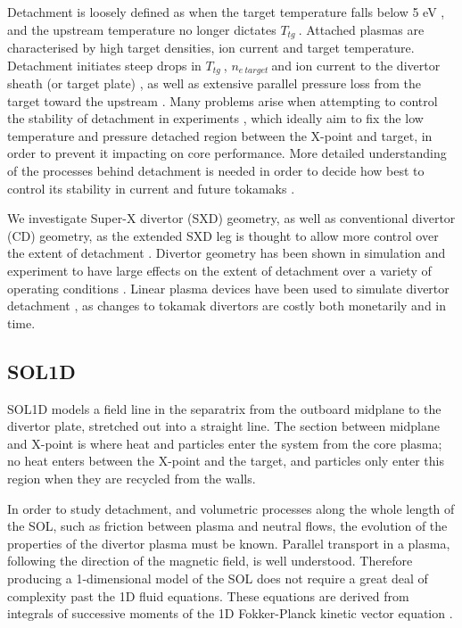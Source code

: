 \documentclass[12pt]{article}  %
\providecommand{\netarget}{$n_{e~target}~$} %
\providecommand{\Ttg}{$T_{tg}~$} %
\begin{document}
Detachment is loosely defined as when the target temperature falls below 5 eV \cite{Porter1996}, and the upstream temperature no longer dictates \Ttg. Attached plasmas are characterised by high target densities, ion current and target temperature. Detachment initiates steep drops in \Ttg, \netarget and ion current to the divertor sheath (or target plate) \cite{Stacey2001}, as well as extensive parallel pressure loss from the target toward the upstream \cite{Nakazawa2000}. Many problems arise when attempting to control the stability of detachment in experiments \cite{Lipschultz2016}, which ideally aim to fix the low temperature and pressure detached region between the X-point and target, in order to prevent it impacting on core performance. More detailed understanding of the processes behind detachment is needed in order to decide how best to control its stability in current and future tokamaks \cite{Reimold2015}.

We investigate Super-X divertor (SXD) geometry, as well as conventional divertor (CD) geometry, as the extended SXD leg is thought to allow more control over the extent of detachment \cite{Valanju2009}. Divertor geometry has been shown in simulation and experiment to have large effects on the extent of detachment over a variety of operating conditions \cite{Pitts2001}. Linear plasma devices have been used to simulate divertor detachment \cite{Nishijima2002, Ohno2002}, as changes to tokamak divertors are costly both monetarily and in time.

\subsection{SOL1D}\label{ssecSOL1D}
SOL1D models a field line in the separatrix from the outboard midplane to the divertor plate, stretched out into a straight line. The section between midplane and X-point is where heat and particles enter the system from the core plasma; no heat enters between the X-point and the target, and particles only enter this region when they are recycled from the walls.

In order to study detachment, and volumetric processes along the whole length of the SOL, such as friction between plasma and neutral flows, the evolution of the properties of the divertor plasma must be known. Parallel transport in a plasma, following the direction of the magnetic field, is well understood. Therefore producing a 1-dimensional model of the SOL does not require a great deal of complexity past the 1D fluid equations. These equations are derived from integrals of successive moments of the 1D Fokker-Planck kinetic vector equation \cite{Stangeby}.
\end{document}
